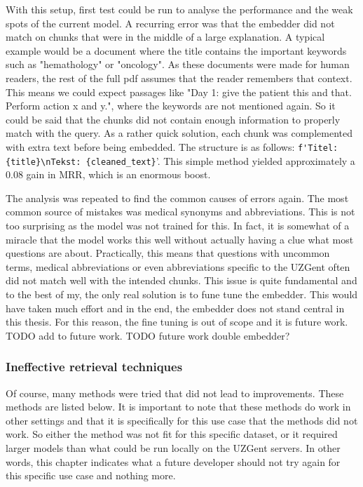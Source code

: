 With this setup, first test could be run to analyse the performance and the weak spots of the current model. A recurring error was that the embedder did not match on chunks that were in the middle of a large explanation. A typical example would be a document where the title contains the important keywords such as "hemathology" or "oncology". As these documents were made for human readers, the rest of the full pdf assumes that the reader remembers that context. This means we could expect passages like "Day 1: give the patient this and that. Perform action x and y.", where the keywords are not mentioned again. So it could be said that the chunks did not contain enough information to properly match with the query. As a rather quick solution, each chunk was complemented with extra text before being embedded. The structure is as follows: \verb|f'Titel: {title}\nTekst: {cleaned_text}|'. This simple method yielded approximately a 0.08 gain in MRR, which is an enormous boost.

The analysis was repeated to find the common causes of errors again. The most common source of mistakes was medical synonyms and abbreviations. This is not too surprising as the model was not trained for this. In fact, it is somewhat of a miracle that the model works this well without actually having a clue what most questions are about. Practically, this means that questions with uncommon terms, medical abbreviations or even abbreviations specific to the UZGent often did not match well with the intended chunks. This issue is quite fundamental and to the best of my, the only real solution is to fune tune the embedder. This would have taken much effort and in the end, the embedder does not stand central in this thesis. For this reason, the fine tuning is out of scope and it is future work. TODO add to future work. TODO future work double embedder?

\subsubsection{Ineffective retrieval techniques}
Of course, many methods were tried that did not lead to improvements. These methods are listed below. It is important to note that these methods do work in other settings and that it is specifically for this use case that the methods did not work. So either the method was not fit for this specific dataset, or it required larger models than what could be run locally on the UZGent servers. In other words, this chapter indicates what a future developer should not try again for this specific use case and nothing more.

